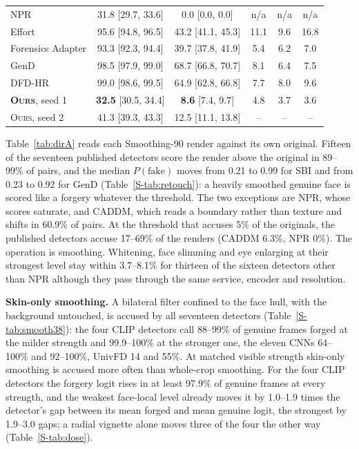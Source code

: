 \documentclass[conference]{IEEEtran}
\newcommand{\ours}{\textsc{Ours}}
\begin{document}
\begin{table}[t]
\begin{tabular}{@{}l cc ccc@{}}
NPR & 31.8 [29.7, 33.6] & 0.0 [0.0, 0.0] & n/a & n/a & n/a \\
Effort & 95.6 [94.8, 96.5] & 43.2 [41.1, 45.3] & 11.1 & 9.6 & 16.8 \\
Forensics Adapter & 93.3 [92.3, 94.4] & 39.7 [37.8, 41.9] & 5.4 & 6.2 & 7.0 \\
GenD & 98.5 [97.9, 99.0] & 68.7 [66.8, 70.7] & 8.1 & 6.4 & 7.5 \\
DFD-HR & 99.0 [98.6, 99.5] & 64.9 [62.8, 66.8] & 7.7 & 8.0 & 9.6 \\
\midrule
\textbf{\ours{}}, seed 1 & \textbf{32.5} [30.5, 34.4] & \textbf{8.6} [7.4, 9.7] & 4.8 & 3.7 & 3.6 \\
\ours{}, seed 2 & 41.3 [39.3, 43.3] & 12.5 [11.1, 13.8] & -- & -- & -- \\
\bottomrule
\end{tabular}
\end{table}

Table~\ref{tab:dirA} reads each Smoothing-90 render against its own original. Fifteen of the seventeen published detectors
score the render above the original in 89--99\% of pairs, and the median $P(\text{fake})$ moves from 0.21 to 0.99 for SBI
and from 0.23 to 0.92 for GenD (Table~\ref{S-tab:retouch}):
a heavily smoothed genuine face is scored like a forgery whatever the threshold. The two exceptions are NPR, whose scores
saturate, and CADDM, which reads a boundary rather than texture and shifts in 60.9\% of pairs. At the threshold that accuses
5\% of the originals, the published detectors accuse 17--69\% of the renders (CADDM 6.3\%, NPR 0\%).
The operation is smoothing. Whitening, face slimming and eye enlarging at their strongest level stay within 3.7--8.1\% for
thirteen of the sixteen detectors other than NPR
although they pass through the same service, encoder and resolution.

\textbf{Skin-only smoothing.} A bilateral filter confined to the face hull, with the background untouched, is accused by all
seventeen detectors (Table~\ref{S-tab:smooth38}): the four CLIP detectors call 88--99\% of genuine frames forged at the
milder strength and 99.9--100\% at the stronger one, the eleven CNNs 64--100\% and 92--100\%, UnivFD 14 and 55\%.
At matched visible strength skin-only smoothing is accused more often than whole-crop smoothing. For the four CLIP detectors
the forgery logit rises in at least 97.9\% of genuine frames at every strength, and the weakest face-local level already moves
it by 1.0--1.9 times the detector's gap between its mean forged and mean genuine logit, the strongest by 1.9--3.0 gaps; a
radial vignette alone moves three of the four the other way (Table~\ref{S-tab:dose}).
\end{document}
